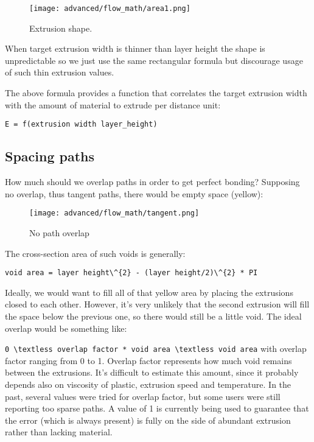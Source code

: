 \begin{figure}[H]
\centering
\texttt{[image: advanced/flow\_math/area1.png]}
\caption{Extrusion shape.}
\label{fig:area1}
\end{figure}

When target extrusion width is thinner than layer height the shape is unpredictable so we just use the same rectangular formula but discourage usage of such thin extrusion values.

The above formula provides a function that correlates the target extrusion width with the amount of material to extrude per distance unit:

\par \verb|E = f(extrusion width layer_height)|

\subsection{Spacing paths}
\label{sec:spacing_paths}

How much should we overlap paths in order to get perfect bonding?
Supposing no overlap, thus tangent paths, there would be empty space (yellow):

\begin{figure}[H]
\centering
\texttt{[image: advanced/flow\_math/tangent.png]}
\caption{No path overlap}
\label{fig:tangent}
\end{figure}

The cross-section area of such voids is generally:

\par \verb|void area = layer height\^{2} - (layer height/2)\^{2} * PI|

Ideally, we would want to fill all of that yellow area by placing the extrusions closed to each other. However, it's very unlikely that the second extrusion will fill the space below the previous one, so there would still be a little void. The ideal overlap would be something like:
\par \verb|0 \textless overlap factor * void area \textless void area|
with overlap factor ranging from 0 to 1. Overlap factor represents how much void remains between the extrusions. It's difficult to estimate this amount, since it probably depends also on viscosity of plastic, extrusion speed and temperature. In the past, several values were tried for overlap factor, but some users were still reporting too sparse paths. A value of 1 is currently being used to guarantee that the error (which is always present) is fully on the side of abundant extrusion rather than lacking material.


